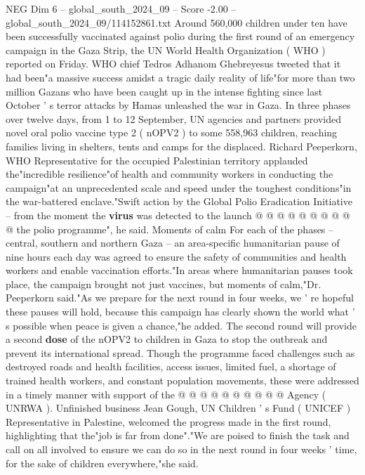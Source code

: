 \begin{textsample}{NEG Dim 6 – global\_south\_2024\_09 – Score -2.00 – global\_south\_2024\_09/114152861.txt}  \label{ex:f6_neg_006}
Around 560,000 children under ten have been successfully vaccinated against polio during the first round of an emergency campaign in the Gaza Strip, the UN World Health Organization ( WHO ) reported on Friday.
WHO chief Tedros Adhanom Ghebreyesus tweeted that it had been"a massive success amidst a tragic daily reality of life"for more than two million Gazans who have been caught up in the intense fighting since last October ' s terror attacks by Hamas unleashed the war in Gaza.
In three phases over twelve days, from 1 to 12 September, UN agencies and partners provided novel oral polio vaccine type 2 ( nOPV2 ) to some 558,963 children, reaching families living in shelters, tents and camps for the displaced.
Richard Peeperkorn, WHO Representative for the occupied Palestinian territory applauded the"incredible resilience"of health and community workers in conducting the campaign"at an unprecedented scale and speed under the toughest conditions"in the war-battered enclave."Swift action by the Global Polio Eradication Initiative -- from the moment the \textbf{virus} was detected to the launch @ @ @ @ @ @ @ @ @ @ the polio programme", he said.
Moments of calm For each of the phases -- central, southern and northern Gaza -- an area-specific humanitarian pause of nine hours each day was agreed to ensure the safety of communities and health workers and enable vaccination efforts."In areas where humanitarian pauses took place, the campaign brought not just vaccines, but moments of calm,"Dr.
Peeperkorn said."As we prepare for the next round in four weeks, we ' re hopeful these pauses will hold, because this campaign has clearly shown the world what ' s possible when peace is given a chance,"he added.
The second round will provide a second \textbf{dose} of the nOPV2 to children in Gaza to stop the outbreak and prevent its international spread.
Though the programme faced challenges such as destroyed roads and health facilities, access issues, limited fuel, a shortage of trained health workers, and constant population movements, these were addressed in a timely manner with support of the @ @ @ @ @ @ @ @ @ @ Agency ( UNRWA ).
Unfinished business Jean Gough, UN Children ' s Fund ( UNICEF ) Representative in Palestine, welcomed the progress made in the first round, highlighting that the"job is far from done"."We are poised to finish the task and call on all involved to ensure we can do so in the next round in four weeks ' time, for the sake of children everywhere,"she said.

\end{textsample}
